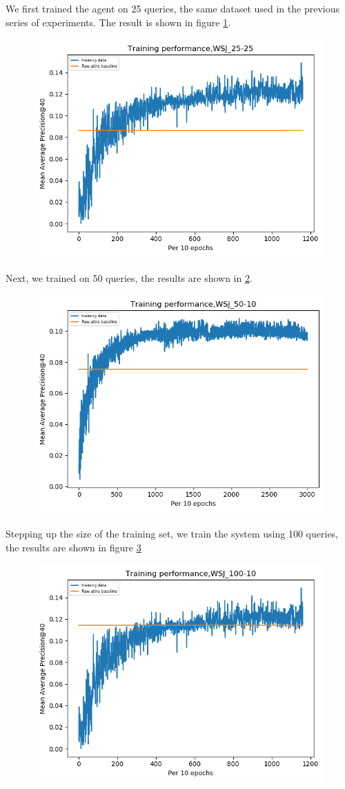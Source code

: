 We first trained the agent on 25 queries, the same dataset used in the previous series of experiments. The result is shown in figure \ref{fig:training2525}. 

\begin{figure}[H]
	\centering
	\includegraphics[width=0.7\linewidth]{images/chapter_4/second_system/training_2525}
	\caption{}
	\label{fig:training2525}
\end{figure}

Next, we trained on 50 queries, the results are shown in \ref{fig:training5010}.

\begin{figure}[H]
	\centering
	\includegraphics[width=0.7\linewidth]{images/chapter_4/second_system/training_5010}
	\caption{}
	\label{fig:training5010}
\end{figure}

Stepping up the size of the training set, we train the system using 100 queries, the results are shown in figure \ref{fig:training10010}


\begin{figure}[H]
	\centering
	\includegraphics[width=0.7\linewidth]{images/chapter_4/second_system/training_10010}
	\caption{}
	\label{fig:training10010}
\end{figure}

